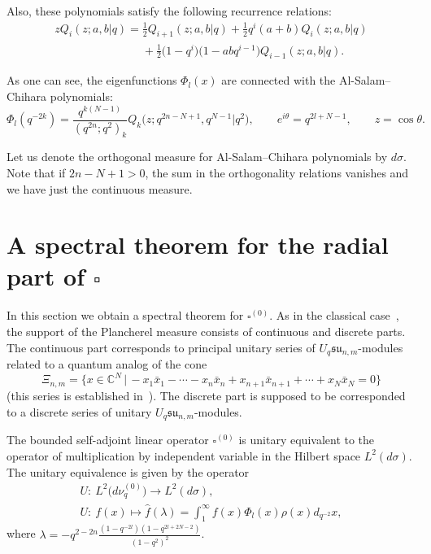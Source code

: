 \documentclass[pdftex]{sigma}
\begin{document}
Also, these polynomials satisfy the following recurrence relations:
\begin{gather}
zQ_i(z;a,b|q)=\frac12
Q_{i+1}(z;a,b|q)+\frac12q^i(a+b)Q_i(z;a,b|q)\nonumber\\
\phantom{zQ_i(z;a,b|q)=}{} +\frac12\big(1-q^i\big)\big(1-abq^{i-1}\big)Q_{i-1}(z;a,b|q).\label{rec_ASC}
\end{gather}

As one can see, the eigenfunctions $\Phi_l(x)$ are connected with the Al-Salam--Chihara polynomials:
\[
\Phi_l(q^{-2k}) = \frac{q^{k(N-1)}}{(q^{2n};q^2)_k}Q_k\big(z;q^{2n-N+1},q^{N-1}|q^2\big), \qquad
e^{i\theta}=q^{2l+N-1},\qquad z=\cos\theta.
\]

Let us denote the orthogonal measure for Al-Salam--Chihara polynomials by $d\sigma$.  Note that if $2n-N+1>0$,
the sum in the orthogonality relations vanishes and we have just the continuous measure.



\section[A spectral theorem for the radial part of $\square$]{A spectral theorem for the radial part of $\boldsymbol{\square}$}\label{sec_9}

In this section we obtain a spectral theorem for $\square^{(0)}$. As in the classical case~\cite[pp.~429--432]{Faraut}, the support of the Plancherel measure consists of continuous and discrete parts.
The continuous part corresponds to principal unitary series of $U_q \mathfrak{su}_{n,m}$-modules related to a
quantum analog of the cone
\[
\Xi_{n,m}=\big\{x \in \mathbb C^{N}\,|\, {-}x_1 \bar{x}_1-\cdots -x_n \bar{x}_n + x_{n+1}\bar{x}_{n+1}+\cdots
+x_N\bar{x}_N=0\big\}
\]
(this series is established in~\cite{BS}). The discrete part is supposed to be corresponded to a discrete
series of unitary $U_q \mathfrak{su}_{n,m}$-modules.

\begin{theorem}
The bounded self-adjoint linear operator $\square^{(0)}$ is unitary equivalent to the operator of
multiplication by independent variable in the Hilbert space $L^2(d\sigma)$. The unitary equivalence is given
by the operator
\begin{gather*}
U:\  L^2\big(d\nu_q^{(0)}\big)  \rightarrow L^2(d\sigma),
\\
U:\ f(x) \mapsto\hat{f}(\lambda)=\int_1^\infty f(x)\Phi_l(x)\rho(x)d_{q^{-2}}x,
\end{gather*}
where $\lambda=-q^{2-2n}\frac{(1-q^{-2l})(1-q^{2l+2N-2})}{(1-q^2)^2}$.
\end{theorem}
\end{document}
